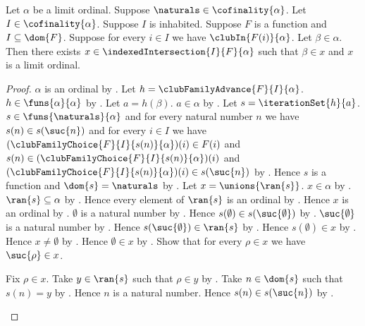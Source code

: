 \begin{theorem}\label{indexed_clubs_have_common_limit_above}
    Let $\alpha$ be a limit ordinal.
    Suppose $\naturals\in\cofinality{\alpha}$.
    Let $I\in\cofinality{\alpha}$.
    Suppose $I$ is inhabited.
    Suppose $F$ is a function and $I\subseteq\dom{F}$.
    Suppose for every $i\in I$ we have $\clubIn{F(i)}{\alpha}$.
    Let $\beta\in\alpha$.
    Then there exists
        $x\in\indexedIntersection{I}{F}{\alpha}$ such that
        $\beta\in x$ and $x$ is a limit ordinal.
\end{theorem}
\begin{proof}
    $\alpha$ is an ordinal by .
    Let $h=\clubFamilyAdvance{F}{I}{\alpha}$.
    $h\in\funs{\alpha}{\alpha}$
        by .
    Let $a=h(\beta)$.
    $a\in\alpha$ by .
    Let $s=\iterationSet{h}{a}$.
    $s\in\funs{\naturals}{\alpha}$ and
        for every natural number $n$ we have
            $s(n)\in s(\suc{n})$ and for every $i\in I$ we have
                $(\clubFamilyChoice{F}{I}{s(n)}{\alpha})(i)\in F(i)$ and
                $s(n)\in(\clubFamilyChoice{F}{I}{s(n)}{\alpha})(i)$ and
                $(\clubFamilyChoice{F}{I}{s(n)}{\alpha})(i)
                    \in s(\suc{n})$
        by .
    Hence $s$ is a function and $\dom{s}=\naturals$
        by .
    Let $x=\unions{\ran{s}}$.
    $x\in\alpha$ by .
    $\ran{s}\subseteq\alpha$ by .
    Hence every element of $\ran{s}$ is an ordinal
        by .
    Hence $x$ is an ordinal by .
    $\emptyset$ is a natural number by .
    Hence $s(\emptyset)\in s(\suc{\emptyset})$
        by .
    $\suc{\emptyset}$ is a natural number by .
    Hence $s(\suc{\emptyset})\in\ran{s}$ by .
    Hence $s(\emptyset)\in x$ by .
    Hence $x\neq\emptyset$ by .
    Hence $\emptyset\in x$
        by .
    Show that for every $\rho\in x$ we have $\suc{\rho}\in x$.
    \begin{subproof}
        Fix $\rho\in x$.
        Take $y\in\ran{s}$ such that $\rho\in y$
            by .
        Take $n\in\dom{s}$ such that $s(n)=y$
            by .
        Hence $n$ is a natural number.
        Hence $s(n)\in s(\suc{n})$
            by .

\end{subproof}
\end{proof}
